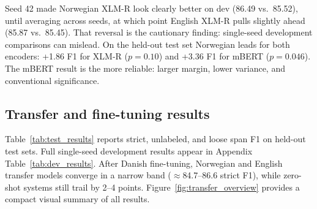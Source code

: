 Seed 42 made Norwegian XLM-R look clearly better on dev (86.49 vs.\ 85.52), until averaging across seeds, at which point English XLM-R pulls slightly ahead (85.87 vs.\ 85.45). That reversal is the cautionary finding: single-seed development comparisons can mislead. On the held-out test set Norwegian leads for both encoders: +1.86 F1 for XLM-R ($p=0.10$) and +3.36 F1 for mBERT ($p=0.046$). The mBERT result is the more reliable: larger margin, lower variance, and conventional significance.

\subsection{Transfer and fine-tuning results}

Table~\ref{tab:test_results} reports strict, unlabeled, and loose span F1 on held-out test sets. Full single-seed development results appear in Appendix Table~\ref{tab:dev_results}. After Danish fine-tuning, Norwegian and English transfer models converge in a narrow band ($\approx$84.7--86.6 strict F1), while zero-shot systems still trail by 2--4 points. Figure~\ref{fig:transfer_overview} provides a compact visual summary of all results.

